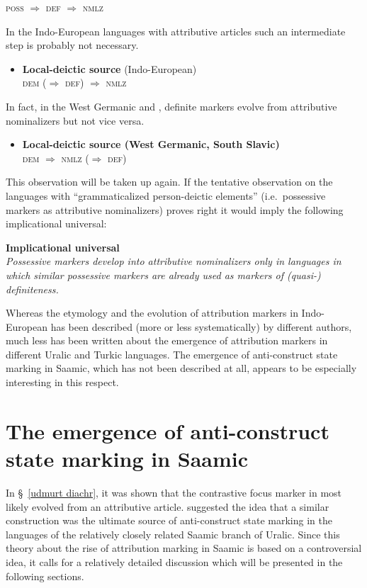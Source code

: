 {\begin{itemize}
	\textsc{poss $\Rightarrow$ def $\Rightarrow$ nmlz}
\end{itemize}
In the Indo-European languages with attributive articles such an intermediate step is probably not necessary.
\begin{itemize}
\item \textbf{Local-deictic source} (Indo-European)\\
	\textsc{dem ($\Rightarrow$ def) $\Rightarrow$ nmlz}
\end{itemize}
In fact, in the West Germanic and , definite markers evolve from attributive nominalizers but not vice versa. 
\begin{itemize}
\item \textbf{Local-deictic source (West Germanic, South Slavic)}\\
	\textsc{dem $\Rightarrow$ nmlz ($\Rightarrow$ def)}
\end{itemize}
This observation will be taken up again. If the tentative observation on the languages with “grammaticalized person-deictic elements” (i.e.~possessive markers as attributive nominalizers) proves right it would imply the following implicational universal:
\begin{exe}
\label{universal}
\ex \rm{\textbf{Implicational universal}}\\
	\textit{Possessive markers develop into attributive nominalizers only in languages in which similar possessive markers are already used as markers of (quasi-) definiteness.}
\end{exe}
Whereas the etymology and the evolution of attribution markers in Indo-European has been described (more or less systematically) by different authors, much less has been written about the emergence of attribution markers in different Uralic and Turkic languages. The emergence of anti-construct state marking in Saamic, which has not been described at all, appears to be especially interesting in this respect.

\section[Anti-construct state in Saamic]{The emergence of anti-construct state marking in Saamic} \label{saamic diachr}
In \S~\ref{udmurt diachr}, it was shown that the contrastive focus marker in  most likely evolved from an attributive article. \cite{riesler2006b} suggested the idea that a similar construction was the ultimate source of anti-construct state marking in the languages of the relatively closely related Saamic branch of Uralic. Since this theory about the rise of attribution marking in Saamic is based on a controversial idea, it calls for a relatively detailed discussion which will be presented in the following sections.

}
